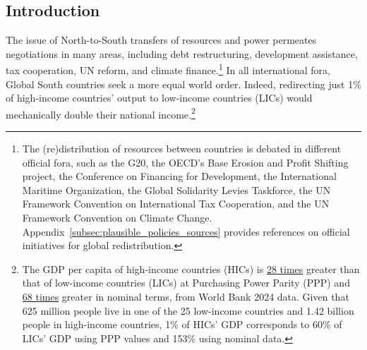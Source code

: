 \documentclass[12pt,english]{article}
\begin{document}

\clearpage
\tableofcontents %

\onehalfspacing %

\begin{bibunit}

\section{Introduction}\label{sec:intro}%

The issue of North-to-South transfers of resources and power 
permeates negotiations in many areas, including debt restructuring, development assistance, tax cooperation, UN reform, and climate finance.\footnote{The (re)distribution of resources between countries is debated in different official fora, such as the G20, the OECD's Base Erosion and Profit Shifting project, the Conference on Financing for Development, the International Maritime Organization, the Global Solidarity Levies Taskforce, the UN Framework Convention on International Tax Cooperation, and the UN Framework Convention on Climate Change. Appendix~\ref{subsec:plausible_policies_sources} provides references on official initiatives for global redistribution.} 
In all international fora, Global South countries seek %
a more equal world order. Indeed, redirecting just 1\% of high-income countries' output to low-income countries (LICs) would mechanically double their national income.\footnote{The GDP per capita of high-income countries (HICs) is \href{https://data.worldbank.org/indicator/NY.GDP.PCAP.PP.CD?contextual=default&end=2024&locations=EU-ZG-XD-XM-1W-IN-US-CD-BI-LU-CN&start=2024&view=bar}{28 times} greater than that of low-income countries (LICs) at Purchasing Power Parity (PPP) and \href{https://data.worldbank.org/indicator/NY.GDP.PCAP.CD?end=2024&locations=EU-ZG-XD-XM-1W-IN-US-CD-BI-LU-CN&start=2024&view=bar}{68 times} greater in nominal terms, from World Bank 2024 data. Given that 625 million people live in one of the 25 low-income countries %
and 1.42 billion people in high-income countries, %
1\% of HICs' GDP corresponds to 60\% of LICs' GDP using PPP values and 153\% using nominal data.
} %


\end{bibunit}
\end{document}
